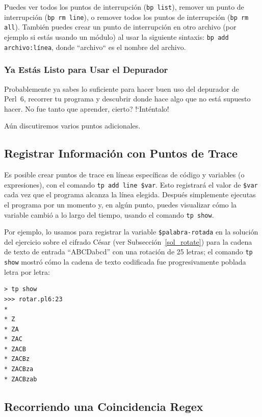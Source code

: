 Puedes ver todos los puntos de interrupción ({\tt bp list}),
remover un punto de interrupción ({\tt bp rm line}), o
remover todos los puntos de interrupción ({\tt bp rm all}).
También puedes crear un punto de interrupción en otro 
archivo (por ejemplo si estás usando un módulo) 
al usar la siguiente sintaxis: {\tt bp add archivo:línea},
donde ``archivo`` es el nombre del archivo.

\subsubsection{Ya Estás Listo para Usar el Depurador}

Probablemente ya sabes lo suficiente para hacer buen uso del 
depurador de Perl~6, recorrer tu programa y descubrir 
donde hace algo que no está supuesto hacer. No fue tanto
que aprender, cierto? !`Inténtalo!

Aún discutiremos varios puntos adicionales.

\subsection{Registrar Información con Puntos de Trace}

Es posible crear puntos de trace en líneas específicas de código y
variables (o expresiones), con el comando {\tt tp add line \$var}.
Esto registrará el valor de \verb|$var| cada vez que el programa
alcanza la línea elegida. Después simplemente ejecutas el 
programa por un momento y, en algún punto, puedes visualizar
cómo la variable cambió a lo largo del tiempo, usando el comando {\tt tp show}.

Por ejemplo, lo usamos para registrar la variable \verb|$palabra-rotada|
en la solución del ejercicio sobre el cifrado César (ver Subsección~\ref{sol_rotate}) 
para la cadena de texto de entrada ``ABCDabcd'' con una rotación
de 25 letras; el comando {\tt tp show} mostró cómo la cadena de texto
codificada fue progresivamente poblada letra por letra:

\begin{lstlisting}
> tp show
>>> rotar.pl6:23
*
* Z
* ZA
* ZAC
* ZACB
* ZACBz
* ZACBza
* ZACBzab
\end{lstlisting}

\subsection{Recorriendo una Coincidencia Regex}
\label{regex-debugging}


